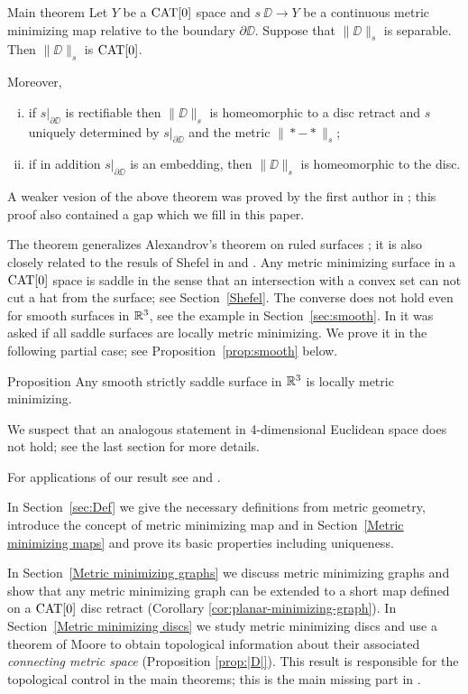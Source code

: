 \documentclass{article}
\begin{document}
\begin{thm}{Main theorem}\label{thm:mainintro}
Let $Y$ be a $\mathop{\rm CAT}\nolimits[0]$ space 
and $s\:\DD\to Y$ be a continuous metric minimizing map relative to the boundary $\partial\DD$.
Suppose that $\|\DD\|_s$  is separable. 
Then $\|\DD\|_s$ is $\mathop{\rm CAT}\nolimits[0]$.

Moreover, 
\begin{enumerate}[(i)]
\item if $s|_{\partial\DD}$ is rectifiable then $\|\DD\|_s$ is homeomorphic to a disc retract
and $s$ uniquely determined by $s|_{\partial\DD}$ and the metric $\|{*}-{*}\|_s$;
\item if in addition $s|_{\partial\DD}$ is an embedding, then $\|\DD\|_s$ is homeomorphic to the disc.
\end{enumerate}
\end{thm}

A weaker vesion of the above theorem was proved by the first author in \cite{petrunin-metric-min};
this proof also contained a gap which we fill in this paper.

The theorem generalizes Alexandrov's theorem on ruled surfaces \cite{A};
it is also closely related to the resuls of Shefel in \cite{shefel-2D} and \cite{shefel-3D}. 
Any metric minimizing surface in a $\mathop{\rm CAT}\nolimits[0]$ space is saddle 
in the sense that an intersection with a convex set can not cut a hat from the surface;
see Section~\ref{Shefel}.
The converse does not hold even for smooth surfaces in $\mathbb{R}^3$, see the example in Section~\ref{sec:smooth}.
In \cite{petrunin-metric-min} it was asked if all saddle surfaces are locally metric minimizing.
We prove it in the following partial case; 
see Proposition~\ref{prop:smooth} below. 

\begin{thm}{Proposition}
Any smooth strictly saddle surface in $\mathbb{R}^3$ is locally metric minimizing. 
\end{thm}

We suspect that an analogous statement in 4-dimensional Euclidean space does not hold;
see the last section for more details.

For applications of our result see \cite{LSW} and \cite{St}.

In Section~\ref{sec:Def} we give the necessary definitions from metric geometry, introduce the concept of metric minimizing map
and in Section~\ref{Metric minimizing maps} and prove its basic properties including uniqueness. 

In Section~\ref{Metric minimizing graphs}
we discuss metric minimizing graphs and show that any metric minimizing graph can be extended to a short
map defined on a $\mathop{\rm CAT}\nolimits[0]$ disc retract (Corollary \ref{cor:planar-minimizing-graph}). 
In Section~\ref{Metric minimizing discs} we study metric minimizing discs and use a theorem of Moore \cite{moore} to obtain 
topological information about  their associated \emph{connecting metric space} (Proposition \ref{prop:|D|}). 
This result is responsible for 
the topological control in the main theorems;
this is the main missing part in \cite{petrunin-metric-min}. 
\end{document}
